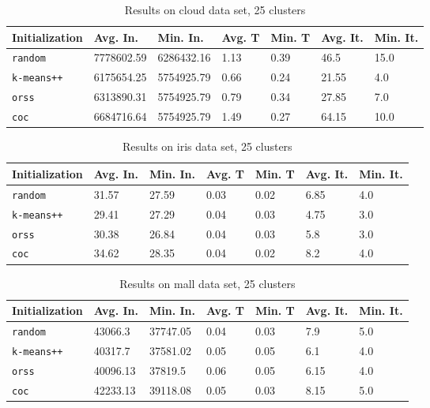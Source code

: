 \documentclass[twoside, 11pt]{article}
\begin{document}
		\begin{table}[p]
			\begin{center}
				\begin{tabular}{|l|l|l|l|l|l|l|}
					\hline
					Initialization & Avg. In. & Min. In. & Avg. T & Min. T & Avg. It. & Min. It.\\\hline
					\texttt{random} & 7778602.59 & 6286432.16 & 1.13 & 0.39 & 46.5 & 15.0\\\hline
					\texttt{k-means++} & 6175654.25 & 5754925.79 & 0.66 & 0.24 & 21.55 & 4.0\\\hline
					\texttt{orss} & 6313890.31 & 5754925.79 & 0.79 & 0.34 & 27.85 & 7.0\\\hline
					\texttt{coc} & 6684716.64 & 5754925.79 & 1.49 & 0.27 & 64.15 & 10.0\\\hline
				\end{tabular}
				\caption{Results on cloud data set, 25 clusters}
				\label{tbl:cloud25}
			\end{center}
		\end{table}
		
		\begin{table}[p]
			\begin{center}
				\begin{tabular}{|l|l|l|l|l|l|l|}
					\hline
					Initialization & Avg. In. & Min. In. & Avg. T & Min. T & Avg. It. & Min. It.\\\hline
					\texttt{random} & 31.57 & 27.59 & 0.03 & 0.02 & 6.85 & 4.0\\\hline
					\texttt{k-means++} & 29.41 & 27.29 & 0.04 & 0.03 & 4.75 & 3.0\\\hline
					\texttt{orss} & 30.38 & 26.84 & 0.04 & 0.03 & 5.8 & 3.0\\\hline
					\texttt{coc} & 34.62 & 28.35 & 0.04 & 0.02 & 8.2 & 4.0\\\hline
				\end{tabular}
				\caption{Results on iris data set, 25 clusters}
				\label{tbl:iris25}
			\end{center}
		\end{table}
		
		\begin{table}[p]
			\begin{center}
				\begin{tabular}{|l|l|l|l|l|l|l|}
					\hline
					Initialization & Avg. In. & Min. In. & Avg. T & Min. T & Avg. It. & Min. It.\\\hline
					\texttt{random} & 43066.3 & 37747.05 & 0.04 & 0.03 & 7.9 & 5.0\\\hline
					\texttt{k-means++} & 40317.7 & 37581.02 & 0.05 & 0.05 & 6.1 & 4.0\\\hline
					\texttt{orss} & 40096.13 & 37819.5 & 0.06 & 0.05 & 6.15 & 4.0\\\hline
					\texttt{coc} & 42233.13 & 39118.08 & 0.05 & 0.03 & 8.15 & 5.0\\\hline
				\end{tabular}
				\caption{Results on mall data set, 25 clusters}
				\label{tbl:mall25}
			\end{center}
		\end{table}
		
\end{document}
